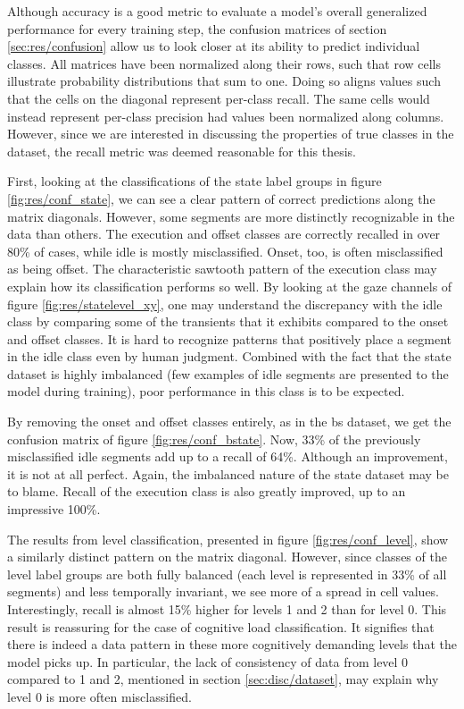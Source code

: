 Although accuracy is a good metric to evaluate a model's overall generalized performance for every training step, the confusion matrices of section \ref{sec:res/confusion} allow us to look closer at its ability to predict individual classes. All matrices have been normalized along their rows, such that row cells illustrate probability distributions that sum to one. Doing so aligns values such that the cells on the diagonal represent per-class recall. 
The same cells would instead represent per-class precision had values been normalized along columns. However, since we are interested in discussing the properties of true classes in the dataset, the recall metric was deemed reasonable for this thesis.

First, looking at the classifications of the state label groups in figure \ref{fig:res/conf_state}, we can see a clear pattern of correct predictions along the matrix diagonals. However, some segments are more distinctly recognizable in the data than others. The execution and offset classes are correctly recalled in over 80\% of cases, while idle is mostly misclassified. Onset, too, is often misclassified as being offset. The characteristic sawtooth pattern of the execution class may explain how its classification performs so well. By looking at the gaze channels of figure \ref{fig:res/statelevel_xy}, one may understand the discrepancy with the idle class by comparing some of the transients that it exhibits compared to the onset and offset classes. It is hard to recognize patterns that positively place a segment in the idle class even by human judgment. Combined with the fact that the state dataset is highly imbalanced (few examples of idle segments are presented to the model during training), poor performance in this class is to be expected.

By removing the onset and offset classes entirely, as in the \acrshort{bs} dataset, we get the confusion matrix of figure \ref{fig:res/conf_bstate}. Now, 33\% of the previously misclassified idle segments add up to a recall of 64\%. Although an improvement, it is not at all perfect. Again, the imbalanced nature of the state dataset may be to blame. Recall of the execution class is also greatly improved, up to an impressive 100\%.

The results from level classification, presented in figure \ref{fig:res/conf_level}, show a similarly distinct pattern on the matrix diagonal. However, since classes of the level label groups are both fully balanced (each level is represented in 33\% of all segments) and less temporally invariant, we see more of a spread in cell values. Interestingly, recall is almost 15\% higher for levels 1 and 2 than for level 0. This result is reassuring for the case of cognitive load classification. It signifies that there is indeed a data pattern in these more cognitively demanding levels that the model picks up. In particular, the lack of consistency of data from level 0 compared to 1 and 2, mentioned in section \ref{sec:disc/dataset}, may explain why level 0 is more often misclassified. 



